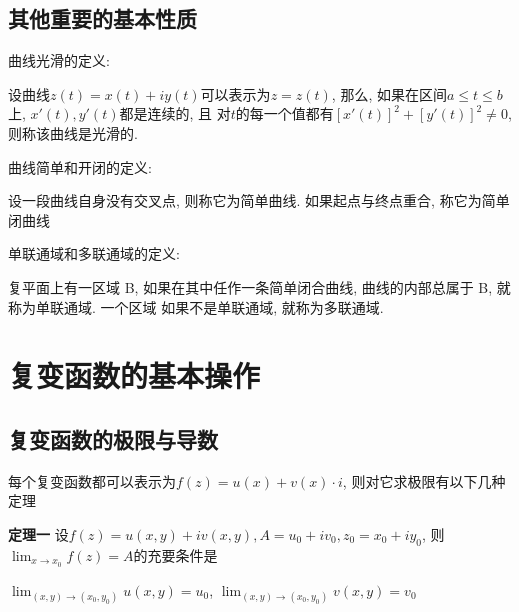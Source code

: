 \documentclass[12pt, a4paper, oneside]{ctexart}
\begin{document}
\subsection{其他重要的基本性质}
曲线光滑的定义: 

\hspace{2em} 设曲线$z(t)=x(t)+iy(t)$可以表示为$z=z(t)$, 那么, 如果在区间$a\leq t \leq b$上, $x'(t), y'(t)$都是连续的, 且
对$t$的每一个值都有$[x'(t)]^{2}+[y'(t)]^{2}\neq0$, 则称该曲线是光滑的.

曲线简单和开闭的定义:

\hspace{2em} 设一段曲线自身没有交叉点, 则称它为简单曲线. 如果起点与终点重合, 称它为简单闭曲线

单联通域和多联通域的定义:

\hspace{2em} 复平面上有一区域 B, 如果在其中任作一条简单闭合曲线, 曲线的内部总属于 B, 就称为单联通域. 一个区域
如果不是单联通域, 就称为多联通域.
\section{复变函数的基本操作}
\subsection{复变函数的极限与导数}

每个复变函数都可以表示为$f(z)=u(x)+v(x)\cdot i$, 则对它求极限有以下几种定理

\textbf{定理一} \hspace{1em}设$f(z)=u(x,y)+iv(x,y), A=u_{0}+iv_{0}, z_{0}=x_{0}+iy_{0}$, 
则$\lim_{x\to x_{0}}f(z)=A$的充要条件是

\hspace{2em}$\lim_{(x,y)\to(x_{0},y_{0}) }u(x,y)=u_{0}$, $\lim_{(x,y)\to(x_{0},y_{0}) }v(x,y)=v_{0}$
\end{document}
